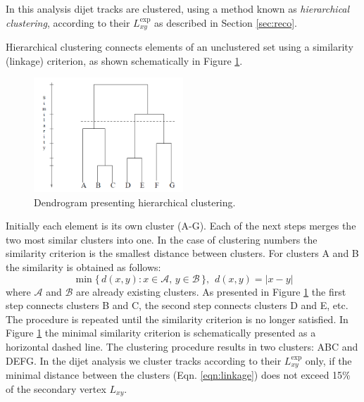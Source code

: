 
In this analysis dijet tracks are clustered, using a method known as {\it hierarchical clustering}, according to 
their $L_{xy}^\text{exp}$ as described in Section \ref{sec:reco}.

Hierarchical clustering connects elements of an unclustered set using a similarity (linkage) criterion,
as shown schematically in Figure \ref{fig:dendrogram}.
\begin{figure}[htbp]
\centering
\includegraphics[width=0.5\textwidth]{plots/dendrogram2.png}
\caption{Dendrogram presenting hierarchical clustering. \label{fig:dendrogram}}
\end{figure}

 Initially each element is its own cluster (A-G). Each of the next steps merges 
the two most similar clusters into one.
In the case of clustering numbers the similarity criterion is the smallest distance 
between clusters. For clusters A and B the similarity is obtained as follows:
\begin{equation}
\min \{\, d(x,y) : x \in \mathcal{A},\, y \in \mathcal{B} \,\}, \hspace{5pt} d(x,y)=|x-y| 
\label{eqn:linkage}
\end{equation}
where $\mathcal{A}$ and $\mathcal{B}$ are already existing clusters.
 As presented in Figure \ref{fig:dendrogram} the first step connects clusters B and C, the second step connects clusters D and E, etc.
The procedure is repeated until the similarity criterion is no longer satisfied. In Figure \ref{fig:dendrogram} the minimal similarity criterion is 
schematically presented as a horizontal
dashed line. The clustering procedure results in two clusters: ABC and DEFG. In the dijet analysis we cluster tracks according to 
their $L_{xy}^\text{exp}$ only, if the minimal distance between the clusters (Eqn. \ref{eqn:linkage}) does not exceed 15\% of the secondary vertex $L_{xy}$.

